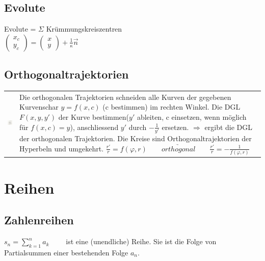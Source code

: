 \subsection{Evolute}
Evolute = $\Sigma$ Krümmungskreiszentren\\
$\left(\begin{matrix} x_c \\ y_c \end{matrix}\right) = \left(\begin{matrix} x \\  y \end{matrix}\right) + \frac{1}{\kappa}\overrightarrow{n}$

\subsection{Orthogonaltrajektorien}
\begin{tabular}{ll}
\parbox{3cm}{
\includegraphics[height=3cm]{./bilder/orthoTrajekt.png}
}
& \parbox{15.5cm}{
Die orthogonalen Trajektorien schneiden alle Kurven der gegebenen Kurvenschar
$y=f(x,c)$ (c bestimmen) im rechten Winkel.
Die DGL $F(x,y,y')$ der Kurve bestimmen($y'$ ableiten, c einsetzen, wenn möglich für $f(x,c) = y$), anschliessend $y'$ durch
$-\frac{1}{y'}$ ersetzen.
$\Rightarrow$ ergibt die DGL der orthogonalen Trajektorien.\\
Die Kreise sind Orthogonaltrajektorien der Hyperbeln und umgekehrt.\\
$\frac{r'}{r} = f(\varphi , r) \qquad \underrightarrow{orthogonal}  \qquad \frac{r'}{r} = - \frac{1}{f(\varphi , r)}$
}
\end{tabular}

\section{Reihen}

\subsection{Zahlenreihen}
$ s_n = \sum\limits_{k=1}^{n} a_k \qquad $ ist eine (unendliche) Reihe. Sie ist die Folge von Partialsummen einer bestehenden Folge $a_n$.

